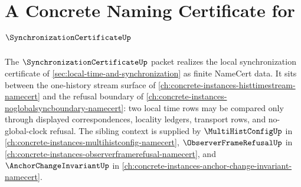 \chapter{A Concrete Naming Certificate for $\SynchronizationCertificateUp$}
\label{ch:concrete-instances-synchronization-certificate-namecert}

The $\SynchronizationCertificateUp$ packet realizes the local synchronization certificate of \autoref{sec:local-time-and-synchronization} as finite NameCert data. It sits between the one-history stream surface of \autoref{ch:concrete-instances-histtimestream-namecert} and the refusal boundary of \autoref{ch:concrete-instances-noglobalsyncboundary-namecert}: two local time rows may be compared only through displayed correspondences, locality ledgers, transport rows, and no-global-clock refusal. The sibling context is supplied by $\MultiHistConfigUp$ in \autoref{ch:concrete-instances-multihistconfig-namecert}, $\ObserverFrameRefusalUp$ in \autoref{ch:concrete-instances-observerframerefusal-namecert}, and $\AnchorChangeInvariantUp$ in \autoref{ch:concrete-instances-anchor-change-invariant-namecert}.

